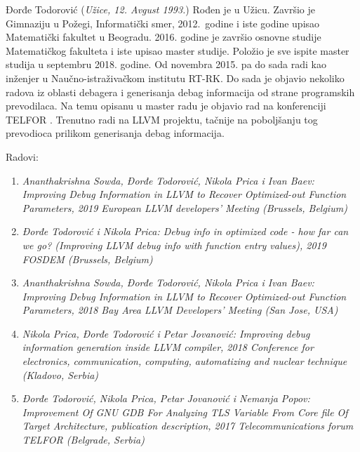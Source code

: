 \documentclass[12pt,oneside]{memoir}
\begin{document}
\literatura

\backmatter

\begin{biografija}
Đorđe Todorović (\emph{Užice, 12. Avgust 1993.}) Rođen je u Užicu. Završio je Gimnaziju u Požegi, Informatički smer, 2012.~godine i iste godine upisao Matematički fakultet u Beogradu. 2016. godine je završio osnovne studije Matematičkog fakulteta i iste upisao master studije. Položio je sve ispite master studija u septembru 2018. godine. Od novembra 2015. pa do sada radi kao inženjer u Naučno-istraživačkom institutu RT-RK. Do sada je objavio nekoliko radova iz oblasti debagera i generisanja debag informacija od strane programskih prevodilaca. Na temu opisanu u master radu je objavio rad na konferenciji TELFOR \cite{TELFOR}. Trenutno radi na LLVM projektu, tačnije na poboljšanju tog prevodioca prilikom generisanja debag informacija.

Radovi:
\begin{enumerate}
	\item \emph{Ananthakrishna Sowda, Đorđe Todorović, Nikola Prica i Ivan Baev: Improving Debug Information in LLVM to Recover Optimized-out Function Parameters, 2019 European LLVM developers' Meeting (Brussels, Belgium)}
	\item \emph{Đorđe Todorović i Nikola Prica: Debug info in optimized code - how far can we go? (Improving LLVM debug info with function entry values), 2019 FOSDEM (Brussels, Belgium)}
	\item \emph{Ananthakrishna Sowda, Đorđe Todorović, Nikola Prica i Ivan Baev: Improving Debug Information in LLVM to Recover Optimized-out Function Parameters, 2018 Bay Area LLVM Developers' Meeting (San Jose, USA)}
	\item \emph{Nikola Prica, Đorđe Todorović i Petar Jovanović: Improving debug information generation inside LLVM compiler, 2018 Conference for electronics, communication, computing, automatizing and nuclear technique (Kladovo, Serbia)}
	\item \emph{Đorđe Todorović, Nikola Prica, Petar Jovanović i Nemanja Popov: Improvement Of GNU GDB For Analyzing TLS Variable From Core file Of Target Architecture, publication description, 2017 Telecommunications forum TELFOR (Belgrade, Serbia)}
\end{enumerate}

\end{biografija}
\end{document}
